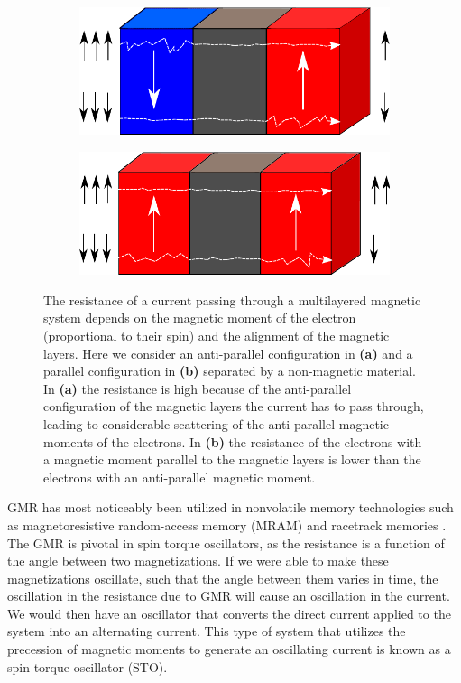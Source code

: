 \begin{figure}[h!]
\centering
  \begin{subfigure}[b]{.58\textwidth}
  \includegraphics[width=\linewidth]{Figures/GMR_APv2.pdf}
  \caption{}
  \label{fig:GMR_AP}
\end{subfigure}
\begin{subfigure}[b]{.6\textwidth}
  \includegraphics[width=\linewidth]{Figures/GMR_Pv2.pdf}
  \caption{}
  \label{fig:GMR_P}
\end{subfigure}
\caption{The resistance of a current passing through a multilayered magnetic system depends on the magnetic moment of the electron (proportional to their spin) and the alignment of the magnetic layers. Here we consider an anti-parallel configuration in \textbf{(a)} and a parallel configuration in \textbf{(b)} separated by a non-magnetic material. In \textbf{(a)} the resistance is high because of the anti-parallel configuration of the magnetic layers the current has to pass through, leading to considerable scattering of the anti-parallel magnetic moments of the electrons. In \textbf{(b)} the resistance of the electrons with a magnetic moment parallel to the magnetic layers is lower than the electrons with an anti-parallel magnetic moment.}
\label{fig:GMR}
\end{figure}

GMR has most noticeably been utilized in nonvolatile memory technologies such as magnetoresistive random-access memory (MRAM) \cite{Akerman2005} and racetrack memories \cite{Parkin2008}. The GMR is pivotal in spin torque oscillators, as the resistance is a function of the angle between two magnetizations. If we were able to make these magnetizations oscillate, such that the angle between them varies in time, the oscillation in the resistance due to GMR will cause an oscillation in the current. We would then have an oscillator that converts the direct current applied to the system into an alternating current. This type of system that utilizes the precession of magnetic moments to generate an oscillating current is known as a spin torque oscillator (STO).

